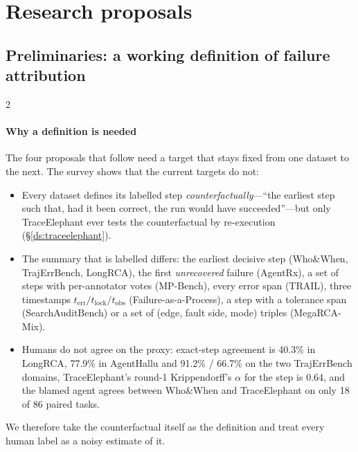 \section{Research proposals}\label{sec:future}

\subsection{Preliminaries: a working definition of failure attribution}\label{sec:future:prelim}

\begin{multicols}{2}
\paragraph{Why a definition is needed} The four proposals that follow need a target that stays fixed from one dataset to the next. The survey shows that the current targets do not:
\begin{itemize}[leftmargin=1.1em]
\item Every dataset defines its labelled step \emph{counterfactually}---``the earliest step such that, had it been correct, the run would have succeeded''---but only TraceElephant ever tests the counterfactual by re-execution (\S\ref{ds:traceelephant}).
\item The summary that is labelled differs: the earliest decisive step (Who\&When, TrajErrBench, LongRCA), the first \emph{unrecovered} failure (AgentRx), a set of steps with per-annotator votes (MP-Bench), every error span (TRAIL), three timestamps $t_{\mathrm{err}}/t_{\mathrm{lock}}/t_{\mathrm{obs}}$ (Failure-as-a-Process), a step with a tolerance span (SearchAuditBench) or a set of (edge, fault side, mode) triples (MegaRCA-Mix).
\item Humans do not agree on the proxy: exact-step agreement is 40.3\% in LongRCA, 77.9\% in AgentHallu and 91.2\% / 66.7\% on the two TrajErrBench domains, TraceElephant's round-1 Krippendorff's $\alpha$ for the step is 0.64, and the blamed agent agrees between Who\&When and TraceElephant on only 18 of 86 paired tasks.
\end{itemize}
We therefore take the counterfactual itself as the definition and treat every human label as a noisy estimate of it.


\end{multicols}
